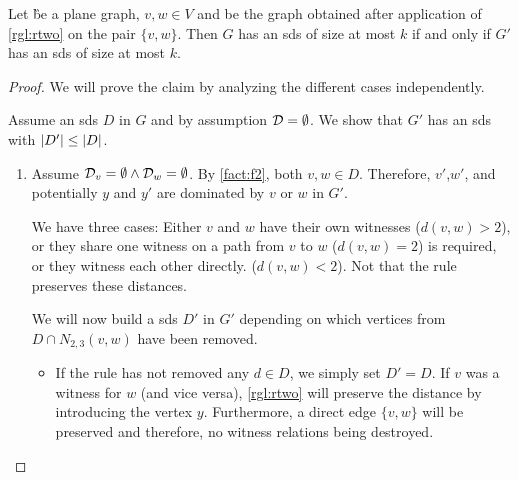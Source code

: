 \begin{lemma}\label{lemma:correctnesstwo}
    Let \G be a plane graph, $v, w \in V$ and \GB be the graph obtained after application of \cref{rgl:rtwo} on the pair $\{v, w\}$. Then $G$ has an sds of size at most $k$ if and only if $G'$ has an sds of size at most $k$.
\end{lemma}
\begin{proof}

We will prove the claim by analyzing the different cases independently.     

Assume an sds $D$ in $G$ and by assumption $\mathcal{D} = \emptyset$. 
We show that $G'$ has an sds with $\abs{D'} \leq \abs{D}$. 
    \begin{enumerate}
        \item Assume $ \mathcal{D}_{v} = \emptyset  \wedge \mathcal{D}_{w} = \emptyset $. By \cref{fact:f2}, both $v, w \in D$.
        Therefore, $v'$,$w'$, and potentially $y$ and $y'$ are dominated by $v$ or $w$ in $G'$.
        
        We have three cases: Either $v$ and $w$ have their own witnesses ($d(v,w) > 2$), or they share one witness on a path from $v$ to $w$ ($d(v,w)= 2$) is required, or they witness each other directly. ($d(v,w) <2$).
        Not that the rule preserves these distances.

        We will now build a sds $D'$ in $G'$ depending on which vertices from $D \cap N_{2,3}(v,w)$ have been removed. 

        \begin{itemize}
            \item If the rule has not removed any $d \in D$, we simply set $D' = D$. 
            If $v$ was a witness for $w$ (and vice versa), \cref{rgl:rtwo} will preserve the distance by introducing the vertex $y$. 
            Furthermore, a direct edge $\{v,w\}$ will be preserved and therefore, no witness relations being destroyed.


\end{itemize}
\end{enumerate}
\end{proof}
